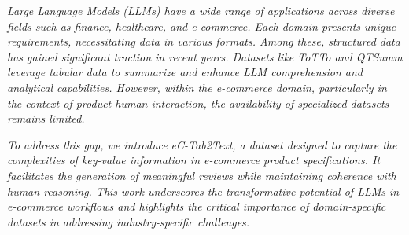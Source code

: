 \textit{Large Language Models (LLMs) have a wide range of applications across diverse fields such as finance, healthcare, and e-commerce. Each domain presents unique requirements, necessitating data in various formats. Among these, structured data has gained significant traction in recent years. Datasets like ToTTo and QTSumm leverage tabular data to summarize and enhance LLM comprehension and analytical capabilities. However, within the e-commerce domain, particularly in the context of product-human interaction, the availability of specialized datasets remains limited.}

\textit{To address this gap, we introduce eC-Tab2Text, a dataset designed to capture the complexities of key-value information in e-commerce product specifications. It facilitates the generation of meaningful reviews while maintaining coherence with human reasoning. This work underscores the transformative potential of LLMs in e-commerce workflows and highlights the critical importance of domain-specific datasets in addressing industry-specific challenges.}
